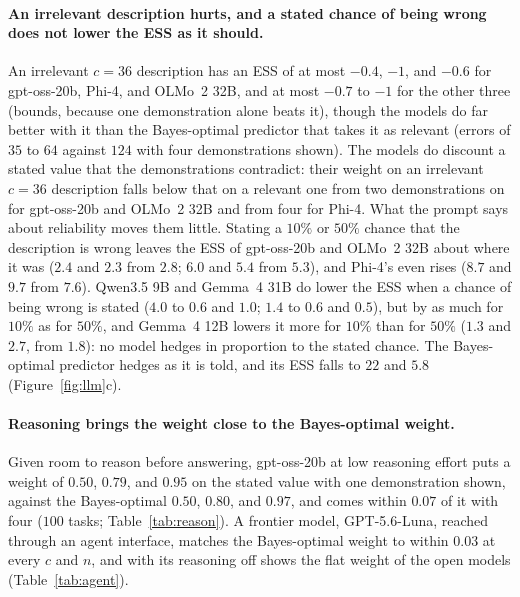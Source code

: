 \documentclass{article}
\begin{document}
\paragraph{An irrelevant description hurts, and a stated chance of being wrong does not lower the ESS as it should.} An irrelevant $c = 36$ description has an ESS of at most $-0.4$, $-1$, and $-0.6$ for gpt-oss-20b, Phi-4, and OLMo~2 32B, and at most $-0.7$ to $-1$ for the other three (bounds, because one demonstration alone beats it), though the models do far better with it than the Bayes-optimal predictor that takes it as relevant (errors of $35$ to $64$ against $124$ with four demonstrations shown). The models do discount a stated value that the demonstrations contradict: their weight on an irrelevant $c = 36$ description falls below that on a relevant one from two demonstrations on for gpt-oss-20b and OLMo~2 32B and from four for Phi-4. What the prompt says about reliability moves them little. Stating a $10\%$ or $50\%$ chance that the description is wrong leaves the ESS of gpt-oss-20b and OLMo~2 32B about where it was ($2.4$ and $2.3$ from $2.8$; $6.0$ and $5.4$ from $5.3$), and Phi-4's even rises ($8.7$ and $9.7$ from $7.6$). Qwen3.5 9B and Gemma~4 31B do lower the ESS when a chance of being wrong is stated ($4.0$ to $0.6$ and $1.0$; $1.4$ to $0.6$ and $0.5$), but by as much for $10\%$ as for $50\%$, and Gemma~4 12B lowers it more for $10\%$ than for $50\%$ ($1.3$ and $2.7$, from $1.8$): no model hedges in proportion to the stated chance. The Bayes-optimal predictor hedges as it is told, and its ESS falls to $22$ and $5.8$ (Figure~\ref{fig:llm}c).

\paragraph{Reasoning brings the weight close to the Bayes-optimal weight.} Given room to reason before answering, gpt-oss-20b at low reasoning effort puts a weight of $0.50$, $0.79$, and $0.95$ on the stated value with one demonstration shown, against the Bayes-optimal $0.50$, $0.80$, and $0.97$, and comes within $0.07$ of it with four ($100$ tasks; Table~\ref{tab:reason}). A frontier model, GPT-5.6-Luna, reached through an agent interface, matches the Bayes-optimal weight to within $0.03$ at every $c$ and $n$, and with its reasoning off shows the flat weight of the open models (Table~\ref{tab:agent}).
\end{document}
